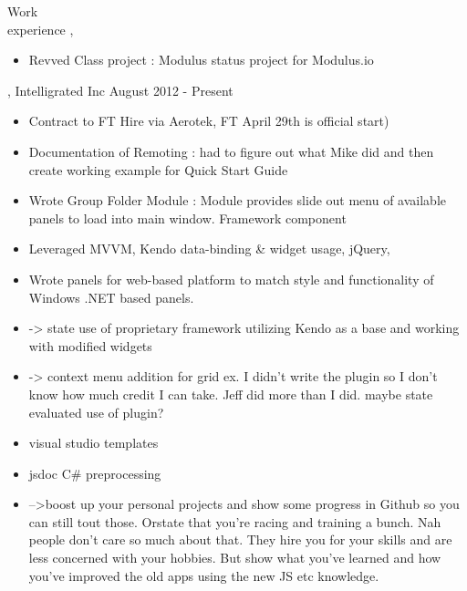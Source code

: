 \begin{category}{Work \\experience}
, 
\begin{itemize}
\item Revved Class project : Modulus status project for Modulus.io 
\end{itemize}

, Intelligrated Inc  August 2012 - Present
\begin{itemize}
\item Contract to FT Hire via Aerotek, FT April 29th is official start)
\item Documentation of Remoting : had to figure out what Mike did and then create working example for Quick Start Guide
\item
Wrote Group Folder Module : Module provides slide out menu of available panels to load into main window. Framework component
\item 
Leveraged MVVM, Kendo data-binding & widget usage, jQuery, 
\item
Wrote panels for web-based platform to match style and functionality of Windows .NET based panels. 
\item
-> state use of proprietary framework utilizing Kendo as a base and working with modified widgets
\item
-> context menu addition for grid ex. I didn't write the plugin so I don't know how much credit I can take. Jeff did more than I did. maybe state evaluated use of plugin?
\item visual studio templates
\item jsdoc C# preprocessing
\item 
-->boost up your personal projects and show some progress in Github so you can still tout those. Orstate that you're racing and training a bunch. 
Nah people don't care so much about that. They hire you for your skills and are less concerned with your hobbies.
But show what you've learned and how you've improved the old apps using the new JS etc knowledge.


\end{itemize}





\end{category}
